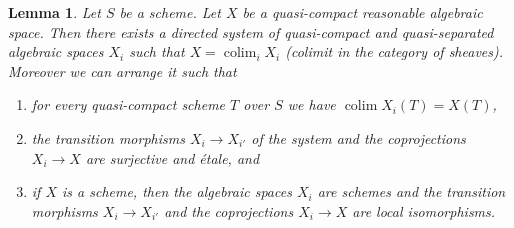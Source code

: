 \documentclass{stacks-project}
\theoremstyle{plain}
\newtheorem{lemma}[subsection]{Lemma}
\theoremstyle{definition}
\theoremstyle{remark}
\numberwithin{equation}{subsection}
\def\colim{\mathop{\mathrm{colim}}\nolimits}
\begin{document}
\begin{lemma}
\label{lemma-fun-property-reasonable}
Let $S$ be a scheme.
Let $X$ be a quasi-compact reasonable algebraic space.
Then there exists a directed system of quasi-compact and quasi-separated
algebraic spaces $X_i$ such that $X = \colim_i X_i$
(colimit in the category of sheaves). Moreover we can arrange it such that
\begin{enumerate}
\item for every quasi-compact scheme $T$ over $S$ we have
$\colim X_i(T) = X(T)$,
\item the transition morphisms $X_i \to X_{i'}$ of the system
and the coprojections $X_i \to X$ are surjective and \'etale, and
\item if $X$ is a scheme, then the algebraic spaces $X_i$ are schemes
and the transition morphisms $X_i \to X_{i'}$
and the coprojections $X_i \to X$ are local isomorphisms.
\end{enumerate}
\end{lemma}
\end{document}
